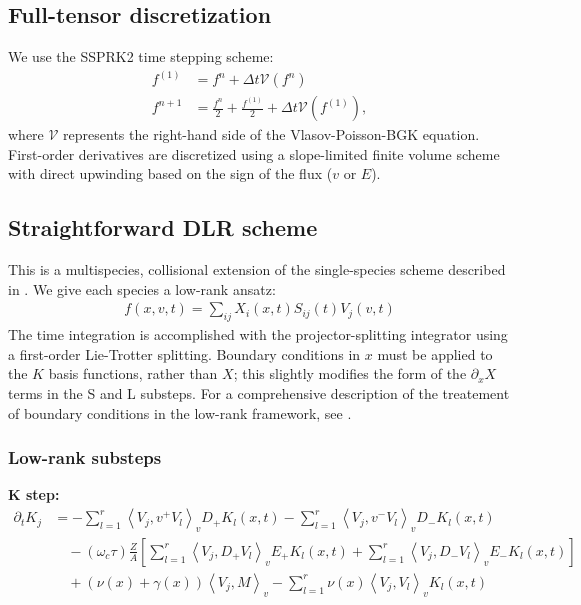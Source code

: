 \documentclass{article}
\begin{document}
\subsection{Full-tensor discretization}

We use the SSPRK2 time stepping scheme:
\begin{align*}
    f^{(1)} &= f^n + \Delta t \mathcal{V}(f^n) \\
    f^{n+1} &= \frac{f^n}{2} + \frac{f^{(1)}}{2} + \Delta t \mathcal{V}(f^{(1)}),
\end{align*}
where $\mathcal{V}$ represents the right-hand side of the Vlasov-Poisson-BGK equation.
First-order derivatives are discretized using a slope-limited finite volume scheme with direct upwinding based on the
sign of the flux ($v$ or $E$).

\subsection{Straightforward DLR scheme}

This is a multispecies, collisional extension of the single-species scheme described in
\cite{einkemmerLowRankProjectorSplittingIntegrator2018}.
We give each species a low-rank ansatz:
\begin{align*}
    f(x, v, t) = \sum_{ij} X_i(x, t) S_{ij}(t) V_j(v, t)
\end{align*}
The time integration is accomplished with the projector-splitting integrator using a first-order
Lie-Trotter splitting.
Boundary conditions in $x$ must be applied to the $K$ basis functions, rather than $X$; this slightly modifies
the form of the $\partial_x X$ terms in the S and L substeps. For a comprehensive description of the treatement
of boundary conditions in the low-rank framework, see \cite{huAdaptiveDynamicalLow2022}.

\subsubsection{Low-rank substeps}

\textbf{K step:}
\begin{align*}
    \partial_t K_j &= -\sum_{l=1}^r \left\langle V_j, v^+ V_l \right\rangle_v D_+ K_l(x, t) - \sum_{l=1}^r \left\langle V_j, v^- V_l \right\rangle_v D_- K_l(x, t)  \\
                         &\quad - (\omega_c \tau) \frac{Z}{A} \left[ \sum_{l=1}^r \left\langle V_j, D_+ V_l \right\rangle_v E_+ K_l(x, t) + \sum_{l=1}^r \left\langle V_j, D_- V_l \right\rangle_v E_- K_l(x, t) \right] \\
                         &\quad + (\nu(x) + \gamma(x)) \left\langle V_j, M \right\rangle_v - \sum_{l=1}^r \nu(x)  \left\langle V_j, V_l \right\rangle_v K_l(x, t)
\end{align*}
\end{document}

